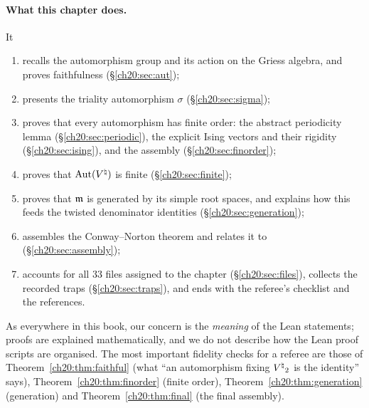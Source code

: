\paragraph{What this chapter does.}  It
\begin{enumerate}[label=(\arabic*)]
\item recalls the automorphism group  and its action on the Griess algebra, and proves faithfulness
  (\S\ref{ch20:sec:aut});
\item presents the triality automorphism $\sigma$ (\S\ref{ch20:sec:sigma});
\item proves that every automorphism has finite order: the abstract periodicity lemma
  (\S\ref{ch20:sec:periodic}), the explicit Ising vectors and their rigidity (\S\ref{ch20:sec:ising}), and the
  assembly (\S\ref{ch20:sec:finorder});
\item proves that $\operatorname{Aut}({V^{\natural}})$ is finite (\S\ref{ch20:sec:finite});
\item proves that $\mathfrak m$ is generated by its simple root spaces, and explains how this feeds the twisted
  denominator identities (\S\ref{ch20:sec:generation});
\item assembles the Conway--Norton theorem and relates it to  (\S\ref{ch20:sec:assembly});
\item accounts for all $33$ files assigned to the chapter (\S\ref{ch20:sec:files}), collects the recorded traps
  (\S\ref{ch20:sec:traps}), and ends with the referee's checklist and the references.
\end{enumerate}
As everywhere in this book, our concern is the \emph{meaning} of the Lean statements; proofs are explained
mathematically, and we do not describe how the Lean proof scripts are organised.  The most important fidelity checks
for a referee are those of Theorem~\ref{ch20:thm:faithful} (what ``an automorphism fixing ${V^{\natural}}_2$ is the
identity'' says), Theorem~\ref{ch20:thm:finorder} (finite order), Theorem~\ref{ch20:thm:generation} (generation)
and Theorem~\ref{ch20:thm:final} (the final assembly).

